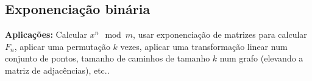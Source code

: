 \subsection{Exponenciação binária}


\textbf{Aplicações:} Calcular $x^n \mod m$, usar exponenciação de matrizes para calcular $F_n$, aplicar uma permutação $k$ vezes, aplicar uma transformação linear num conjunto de pontos, tamanho de caminhos de tamanho $k$ num grafo (elevando a matriz de adjacências), etc..

